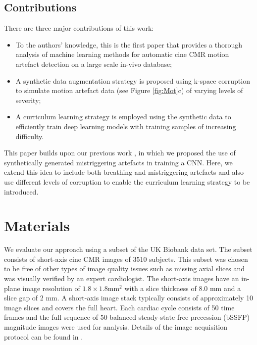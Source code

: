 \documentclass[preprint,12pt,authoryear]{elsarticle}
\begin{document}
  \subsection{Contributions}
\label{sec:contributions}

There are three major contributions of this work:
\begin{itemize}
    \item To the authors' knowledge, this is the first paper that provides a thorough analysis of machine learning methods for automatic cine CMR motion artefact detection on a large scale in-vivo database;
    \item A synthetic data augmentation strategy is proposed using k-space corruption to simulate motion artefact data (see Figure \ref{fig:Mot}c) of varying levels of severity;
    \item A curriculum learning strategy is employed using the synthetic data to efficiently train deep learning models with training samples of increasing difficulty.
\end{itemize}
This paper builds upon our previous work \citep{Oksuz2018}, in which we proposed the use of synthetically generated mistriggering artefacts in training a CNN. Here, we extend this idea to include both breathing and mistriggering artefacts and also use different levels of corruption to enable the curriculum learning strategy to be introduced.


\section{Materials}
\label{sec:materials}



We evaluate our approach using a subset of the UK Biobank data set.
The subset  consists  of  short-axis cine CMR images of 3510 subjects. This subset was chosen to be free of other types of image quality issues such as missing axial slices and was visually verified by an expert cardiologist. The short-axis images have an in-plane image resolution of $1.8 \times 1.8 $mm$^{2}$ with a slice thickness of 8.0 mm and a slice gap of 2 mm. A short-axis image stack typically consists of approximately  10 image slices and covers the full heart. Each cardiac cycle consists of 50 time frames and the full sequence of 50 balanced  steady-state free precession (bSSFP) magnitude images were used for analysis. Details of the image acquisition protocol can be found in \cite{Petersen2015}. \\
\end{document}
